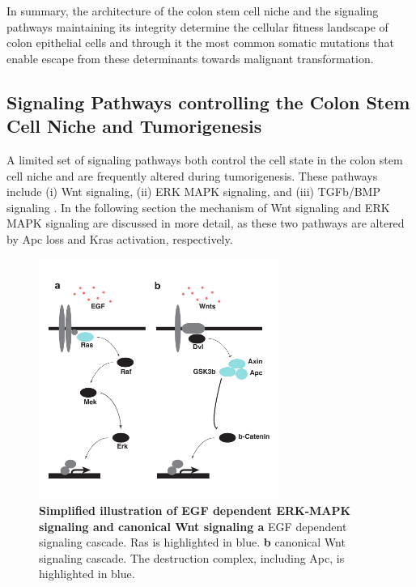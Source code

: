 \begin{flushleft}
In summary, the architecture of the colon stem cell niche and the signaling pathways maintaining its integrity determine the cellular fitness landscape of colon epithelial cells and through it the most common somatic mutations that enable escape from these determinants towards malignant transformation.

\subsection{Signaling Pathways controlling the Colon Stem Cell Niche and Tumorigenesis}

A limited set of signaling pathways both control the cell state in the colon stem cell niche and are frequently altered during tumorigenesis. These pathways include (i) Wnt signaling, (ii) ERK MAPK signaling, and (iii) TGFb/BMP signaling \cite{gehartTalesCryptNew2019a}. In the following section the mechanism of Wnt signaling and ERK MAPK signaling are discussed in more detail, as these two pathways are altered by Apc loss and Kras activation, respectively.

\begin{figure}[h]
\centering
\includegraphics[width=0.7\textwidth,
                keepaspectratio]{figures/adenomaprofiling/pdf/fig_0_1.pdf}
\caption[Simplified illustration of ERK-MAPK signaling and canonical Wnt signaling]{\textbf{Simplified illustration of EGF dependent ERK-MAPK signaling and canonical Wnt signaling a} EGF dependent signaling cascade. Ras is highlighted in blue. \textbf{b} canonical Wnt signaling cascade. The destruction complex, including Apc, is highlighted in blue.}
\label{fig_180}
\end{figure}
\bigbreak


\end{flushleft}
